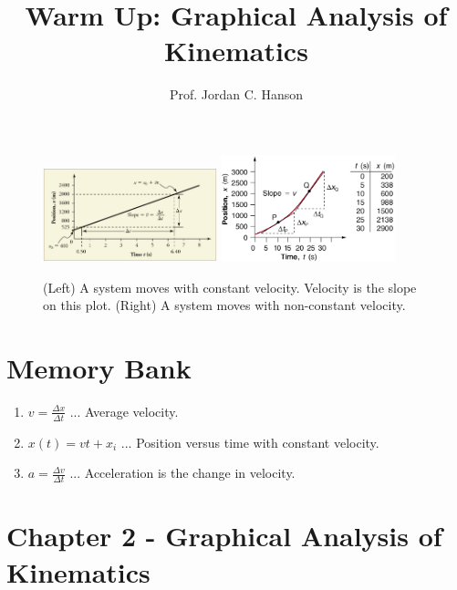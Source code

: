 \documentclass{article}
\begin{document}
\title{Warm Up: Graphical Analysis of Kinematics}
\author{Prof. Jordan C. Hanson}

\maketitle

\begin{figure}
\centering
\includegraphics[width=0.45\textwidth]{figures/slope.jpeg} \hspace{1cm}
\includegraphics[width=0.45\textwidth]{figures/slope2.jpeg}
\caption{\label{fig:1} (Left) A system moves with constant velocity.  Velocity is the slope on this plot. (Right) A system moves with non-constant velocity.}
\end{figure}

\section{Memory Bank}

\begin{enumerate}
\item $v = \frac{\Delta x}{\Delta t}$ ... Average velocity.
\item $x(t) = v t + x_i$ ... Position versus time with constant velocity.
\item $a = \frac{\Delta v}{\Delta t}$ ... Acceleration is the change in velocity.
\end{enumerate}

\section{Chapter 2 - Graphical Analysis of Kinematics}
\end{document}
